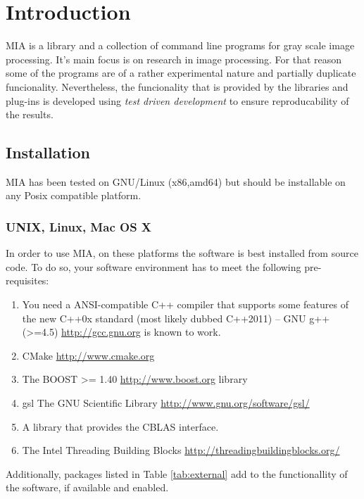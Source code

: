 \documentclass[english, 10pt, a4paper,headsepline,openany]{scrbook}
\begin{document}
\pagestyle{headings}


\chapter{Introduction}

MIA is a library and a collection of command line programs for gray scale image processing. 
It's main focus is on research in image processing.
For that reason some of the programs are of a rather experimental nature and partially 
   duplicate funcionality. 
Nevertheless, the funcionality that is provided by the libraries and plug-ins is developed 
  using \emph{test driven development} to ensure reproducability of the results.
 


\section{Installation}

MIA has been tested on GNU/Linux (x86,amd64) but should be installable on any Posix compatible platform. 


\subsection{UNIX, Linux, Mac OS X} 

In order to use MIA, on these platforms the software is best installed from source code. 
To do so, your software environment has to meet the following pre-requisites: 

\begin{enumerate}
\item You need a ANSI-compatible C++ compiler that supports some features of the new C++0x standard 
       (most likely dubbed C++2011) -- GNU g++ (>=4.5) \url{http://gcc.gnu.org} is known to work. 
\item CMake \url{http://www.cmake.org}
\item The BOOST >= 1.40 \url{http://www.boost.org} library
\item gsl The GNU Scientific Library \url{http://www.gnu.org/software/gsl/}
\item A library that provides the CBLAS interface.
\item The Intel Threading Building Blocks \url{http://threadingbuildingblocks.org/}
\end{enumerate}

\noindent 
Additionally, packages listed in Table \ref{tab:external} add to the functionallity of the software, 
   if available and enabled.
\end{document}
